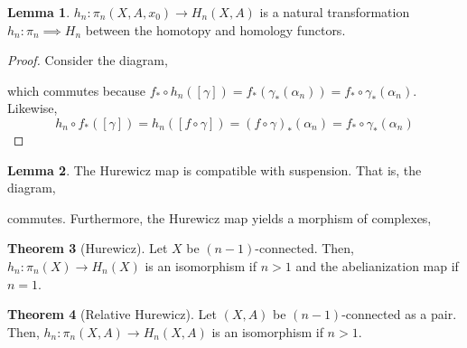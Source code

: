 \documentclass[12pt]{extarticle}
\theoremstyle{definition}
\newtheorem{theorem}{Theorem}[section]
\newtheorem{lemma}[theorem]{Lemma}
\begin{document}
\begin{lemma}
$h_n : \pi_n(X, A, x_0) \to H_n(X, A)$ is a natural transformation $h_n : \pi_n \implies H_n$  between the homotopy and homology functors. 
\end{lemma}

\begin{proof}
Consider the diagram,
\begin{center}
\end{center}
which commutes because $f_* \circ h_n([\gamma]) = f_*(\gamma_*(\alpha_n)) = f_* \circ \gamma_*(\alpha_n)$. Likewise, \[h_n \circ f_*([\gamma]) = h_n([f \circ \gamma]) = (f \circ \gamma)_*(\alpha_n) = f_* \circ \gamma_*(\alpha_n)\]
\end{proof}

\begin{lemma}
The Hurewicz map is compatible with suspension. That is, the diagram,
\begin{center}
\end{center}
commutes. Furthermore, the Hurewicz map yields a morphism of complexes,
\begin{center}
\end{center}
\end{lemma}

\begin{theorem}[Hurewicz]
Let $X$ be $(n-1)$-connected. Then, $h_n : \pi_n(X) \to H_n(X)$ is an isomorphism if $n > 1$ and the abelianization map if $n = 1$. 
\end{theorem}

\begin{theorem}[Relative Hurewicz]
Let $(X, A)$ be $(n-1)$-connected as a pair. Then, $h_n : \pi_n(X, A) \to H_n(X, A)$ is an isomorphism if $n > 1$. 
\end{theorem}
\end{document}
